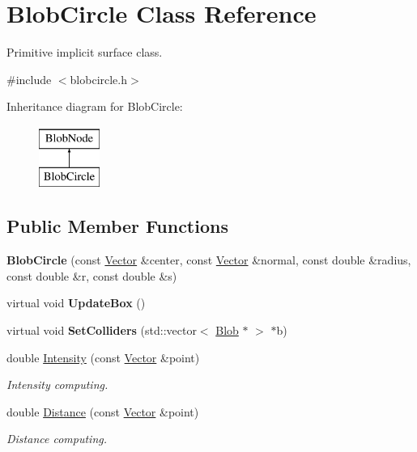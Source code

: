 \hypertarget{class_blob_circle}{
\section{BlobCircle Class Reference}
\label{class_blob_circle}
}


Primitive implicit surface class.  




{\ttfamily \#include $<$blobcircle.h$>$}

Inheritance diagram for BlobCircle:\begin{figure}[H]
\begin{center}
\leavevmode
\includegraphics[height=2.000000cm]{class_blob_circle}
\end{center}
\end{figure}
\subsection*{Public Member Functions}
\begin{DoxyCompactItemize}
\item 
\hypertarget{class_blob_circle_a6c10156952ccc997472433df3dbeecbc}{
{\bfseries BlobCircle} (const \hyperlink{class_vector}{Vector} \&center, const \hyperlink{class_vector}{Vector} \&normal, const double \&radius, const double \&r, const double \&s)}
\label{class_blob_circle_a6c10156952ccc997472433df3dbeecbc}

\item 
\hypertarget{class_blob_circle_a83df1558a4cf1c395cfba3579a851f50}{
virtual void {\bfseries UpdateBox} ()}
\label{class_blob_circle_a83df1558a4cf1c395cfba3579a851f50}

\item 
\hypertarget{class_blob_circle_a623206eccf71b62b907a47f27d1947e0}{
virtual void {\bfseries SetColliders} (std::vector$<$ \hyperlink{class_blob}{Blob} $\ast$ $>$ $\ast$b)}
\label{class_blob_circle_a623206eccf71b62b907a47f27d1947e0}

\item 
double \hyperlink{class_blob_circle_a3ab41ef32643b1e53c09c2a966bebe0d}{Intensity} (const \hyperlink{class_vector}{Vector} \&point)
\begin{DoxyCompactList}\small\item\em Intensity computing. \item\end{DoxyCompactList}\item 
double \hyperlink{class_blob_circle_a034e86127a91f23266de09fbd1cff728}{Distance} (const \hyperlink{class_vector}{Vector} \&point)
\begin{DoxyCompactList}\small\item\em Distance computing. \item\end{DoxyCompactList}\end{DoxyCompactItemize}


